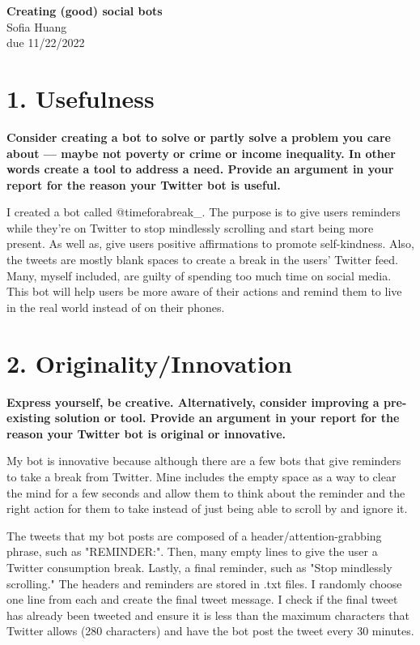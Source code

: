 \documentclass[12pt]{article}
\begin{document}
\begin{centering}
{\large\textbf{Creating (good) social bots}}\\ 
Sofia Huang\\
due 11/22/2022\\
\end{centering}


\section*{1. Usefulness}
\noindent \textbf{Consider creating a bot to solve or partly solve a problem you care about --- maybe not poverty or crime or income inequality. In other words create a tool to address a need. Provide an argument in your report for the reason your Twitter bot is useful.}

I created a bot called @timeforabreak\_. The purpose is to give users reminders while they're on Twitter to stop mindlessly scrolling and start being more present. As well as, give users positive affirmations to promote self-kindness. Also, the tweets are mostly blank spaces to create a break in the users' Twitter feed. Many, myself included, are guilty of spending too much time on social media. This bot will help users be more aware of their actions and remind them to live in the real world instead of on their phones. 

\section*{2. Originality/Innovation}
\noindent \textbf{Express yourself, be creative. Alternatively, consider improving a pre-existing solution or tool. Provide an argument in your report for the reason your Twitter bot is original or innovative.}

My bot is innovative because although there are a few bots that give reminders to take a break from Twitter. Mine includes the empty space as a way to clear the mind for a few seconds and allow them to think about the reminder and the right action for them to take instead of just being able to scroll by and ignore it. 

The tweets that my bot posts are composed of a header/attention-grabbing phrase, such as "REMINDER:". Then, many empty lines to give the user a Twitter consumption break. Lastly, a final reminder, such as "Stop mindlessly scrolling." The headers and reminders are stored in .txt files. I randomly choose one line from each and create the final tweet message. I check if the final tweet has already been tweeted and ensure it is less than the maximum characters that Twitter allows (280 characters) and have the bot post the tweet every 30 minutes. 
\end{document}
